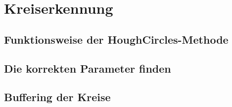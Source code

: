 \section{Kreiserkennung}

\subsection{Funktionsweise der HoughCircles-Methode}
\subsection{Die korrekten Parameter finden}
\subsection{Buffering der Kreise}